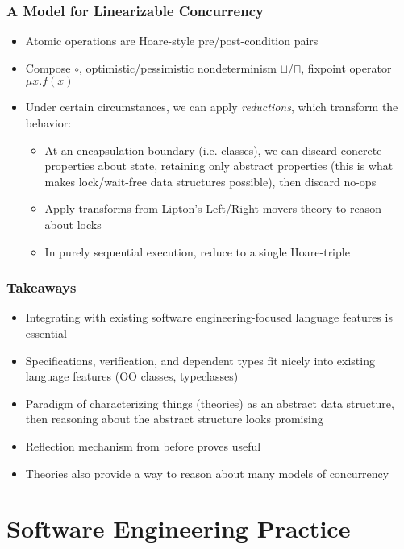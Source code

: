 \documentclass{beamer}
\begin{document}
\begin{frame}
  \frametitle{A Model for Linearizable Concurrency}
  \begin{itemize}
    \item Atomic operations are Hoare-style pre/post-condition pairs
    \item Compose $\circ$, optimistic/pessimistic nondeterminism
      $\sqcup$/$\sqcap$, fixpoint operator $\mu x. f(x)$
    \item Under certain circumstances, we can apply \emph{reductions},
      which transform the behavior:
      \begin{itemize}
        \item At an encapsulation boundary (i.e. classes), we can
          discard concrete properties about state, retaining only
          abstract properties (this is what makes lock/wait-free data
          structures possible), then discard no-ops
        \item Apply transforms from Lipton's Left/Right movers theory
          to reason about locks
        \item In purely sequential execution, reduce to a single
          Hoare-triple
      \end{itemize}
  \end{itemize}
\end{frame}

\begin{frame}
  \frametitle{Takeaways}
  \begin{itemize}
    \item Integrating with existing software engineering-focused
      language features is essential
    \item Specifications, verification, and dependent types fit nicely
      into existing language features (OO classes, typeclasses)
    \item Paradigm of characterizing things (theories) as an abstract
      data structure, then reasoning about the abstract structure
      looks promising
    \item Reflection mechanism from before proves useful
    \item Theories also provide a way to reason about many models of
      concurrency
  \end{itemize}
\end{frame}

\section{Software Engineering Practice}
\end{document}
